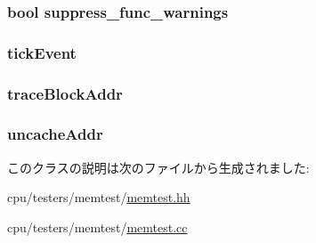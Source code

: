 \label{classMemTest_a245260f6f74972558f61b85227df5aae}
\hypertarget{classMemTest_a5f4982e0dc4eb2df5f01dd41caaf248b}{
\subsubsection[{suppress\_\-func\_\-warnings}]{\setlength{\rightskip}{0pt plus 5cm}bool {\bf suppress\_\-func\_\-warnings}}}
\label{classMemTest_a5f4982e0dc4eb2df5f01dd41caaf248b}
\hypertarget{classMemTest_aa36b8e894416f0ec98f701ab08f2ac22}{
\subsubsection[{tickEvent}]{ {\bf tickEvent}}}
\label{classMemTest_aa36b8e894416f0ec98f701ab08f2ac22}
\hypertarget{classMemTest_ae3e97c58873f5e4cc0933f70403c8c4c}{
\subsubsection[{traceBlockAddr}]{ {\bf traceBlockAddr}}}
\label{classMemTest_ae3e97c58873f5e4cc0933f70403c8c4c}
\hypertarget{classMemTest_a412d3918caf07e4a7ece4af035d8bba8}{
\subsubsection[{uncacheAddr}]{ {\bf uncacheAddr}}}
\label{classMemTest_a412d3918caf07e4a7ece4af035d8bba8}


このクラスの説明は次のファイルから生成されました:\begin{DoxyCompactItemize}
\item 
cpu/testers/memtest/\hyperlink{memtest_8hh}{memtest.hh}\item 
cpu/testers/memtest/\hyperlink{memtest_8cc}{memtest.cc}\end{DoxyCompactItemize}
